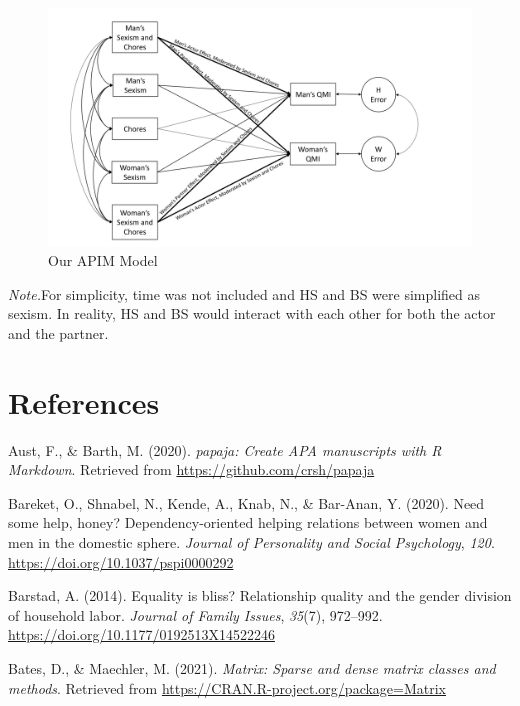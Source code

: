 \documentclass[
  english,
  man]{apa6}
\begin{document}
\begin{figure}
\centering
\includegraphics{APIM.png}
\caption{Our APIM Model}
\end{figure}

\emph{Note.}For simplicity, time was not included and HS and BS were simplified as sexism. In reality, HS and BS would interact with each other for both the actor and the partner.

\newpage

\hypertarget{references}{%
\section{References}\label{references}}

\begingroup
\setlength{\parindent}{-0.5in}
\setlength{\leftskip}{0.5in}

\hypertarget{refs}{}
\leavevmode\hypertarget{ref-R-papaja}{}%
Aust, F., \& Barth, M. (2020). \emph{papaja: Create APA manuscripts with R Markdown}. Retrieved from \url{https://github.com/crsh/papaja}

\leavevmode\hypertarget{ref-Bareket}{}%
Bareket, O., Shnabel, N., Kende, A., Knab, N., \& Bar-Anan, Y. (2020). Need some help, honey? Dependency-oriented helping relations between women and men in the domestic sphere. \emph{Journal of Personality and Social Psychology}, \emph{120}. \url{https://doi.org/10.1037/pspi0000292}

\leavevmode\hypertarget{ref-Barstad}{}%
Barstad, A. (2014). Equality is bliss? Relationship quality and the gender division of household labor. \emph{Journal of Family Issues}, \emph{35}(7), 972--992. \url{https://doi.org/10.1177/0192513X14522246}

\leavevmode\hypertarget{ref-R-Matrix}{}%
Bates, D., \& Maechler, M. (2021). \emph{Matrix: Sparse and dense matrix classes and methods}. Retrieved from \url{https://CRAN.R-project.org/package=Matrix}
\end{document}

